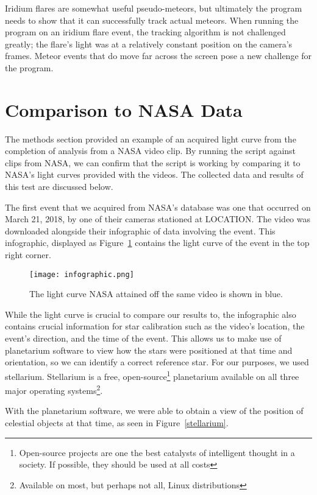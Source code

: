Iridium flares are somewhat useful pseudo-meteors, but ultimately the program needs to show that it can successfully track actual meteors. When running the program on an iridium flare event, the tracking algorithm is not challenged greatly; the flare's light was at a relatively constant position on the camera's frames. Meteor events that do move far across the screen pose a new challenge for the program.

\section{Comparison to NASA Data}

The methods section provided an example of an acquired light curve from the completion of analysis from a NASA video clip. By running the script against clips from NASA, we can confirm that the script is working by comparing it to NASA's light curves provided with the videos. The collected data and results of this test are discussed below.

The first event that we acquired from NASA's database was one that occurred on March 21, 2018, by one of their cameras stationed at LOCATION. The video was downloaded alongside their infographic of data involving the event. This infographic, displayed as Figure~\ref{fig:infographic} contains the light curve of the event in the top right corner. 

\begin{figure}[ht!]
	\centering
	\texttt{[image: infographic.png]}
	\caption{The light curve NASA attained off the same video is shown in blue.}
	\label{fig:infographic}
\end{figure}

While the light curve is crucial to compare our results to, the infographic also contains crucial information for star calibration such as the video's location, the event's direction, and the time of the event. This allows us to make use of planetarium software to view how the stars were positioned at that time and orientation, so we can identify a correct reference star. For our purposes, we used stellarium. Stellarium is a free, open-source\footnote{Open-source projects are one the best catalysts of intelligent thought in a society. If possible, they should be used at all costs} planetarium available on all three major operating systems\footnote{Available on most, but perhaps not all, Linux distributions}.

With the planetarium software, we were able to obtain a view of the position of celestial objects at that time, as seen in Figure~\ref{stellarium}.

